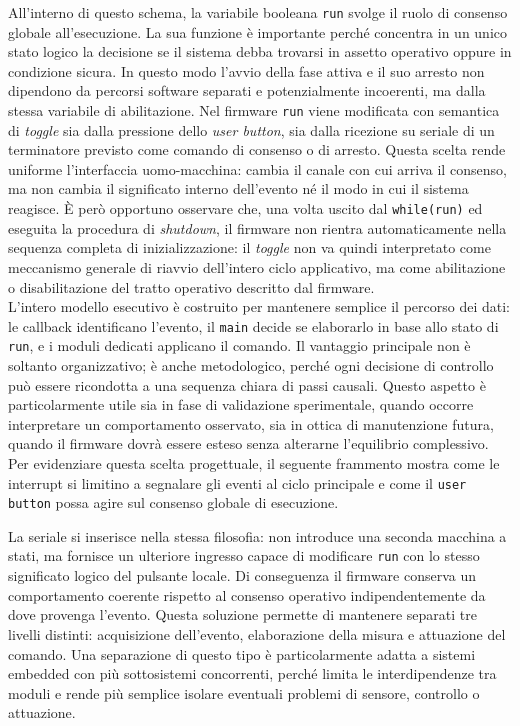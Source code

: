 \documentclass[11pt]{report}
\begin{document}
	All'interno di questo schema, la variabile booleana \texttt{run} svolge il ruolo di consenso globale all'esecuzione. La sua funzione è importante perché concentra in un unico stato logico la decisione se il sistema debba trovarsi in assetto operativo oppure in condizione sicura. In questo modo l'avvio della fase attiva e il suo arresto non dipendono da percorsi software separati e potenzialmente incoerenti, ma dalla stessa variabile di abilitazione. Nel firmware \texttt{run} viene modificata con semantica di \textit{toggle} sia dalla pressione dello \textit{user button}, sia dalla ricezione su seriale di un terminatore previsto come comando di consenso o di arresto. Questa scelta rende uniforme l'interfaccia uomo-macchina: cambia il canale con cui arriva il consenso, ma non cambia il significato interno dell'evento né il modo in cui il sistema reagisce. È però opportuno osservare che, una volta uscito dal \texttt{while(run)} ed eseguita la procedura di \textit{shutdown}, il firmware non rientra automaticamente nella sequenza completa di inizializzazione: il \textit{toggle} non va quindi interpretato come meccanismo generale di riavvio dell'intero ciclo applicativo, ma come abilitazione o disabilitazione del tratto operativo descritto dal firmware.\\
	L'intero modello esecutivo è costruito per mantenere semplice il percorso dei dati: le callback identificano l'evento, il \texttt{main} decide se elaborarlo in base allo stato di \texttt{run}, e i moduli dedicati applicano il comando. Il vantaggio principale non è soltanto organizzativo; è anche metodologico, perché ogni decisione di controllo può essere ricondotta a una sequenza chiara di passi causali. Questo aspetto è particolarmente utile sia in fase di validazione sperimentale, quando occorre interpretare un comportamento osservato, sia in ottica di manutenzione futura, quando il firmware dovrà essere esteso senza alterarne l'equilibrio complessivo.\\
	Per evidenziare questa scelta progettuale, il seguente frammento mostra come le interrupt si limitino a segnalare gli eventi al ciclo principale e come il \texttt{user button} possa agire sul consenso globale di esecuzione.

	

	La seriale si inserisce nella stessa filosofia: non introduce una seconda macchina a stati, ma fornisce un ulteriore ingresso capace di modificare \texttt{run} con lo stesso significato logico del pulsante locale. Di conseguenza il firmware conserva un comportamento coerente rispetto al consenso operativo indipendentemente da dove provenga l'evento. Questa soluzione permette di mantenere separati tre livelli distinti: acquisizione dell'evento, elaborazione della misura e attuazione del comando. Una separazione di questo tipo è particolarmente adatta a sistemi embedded con più sottosistemi concorrenti, perché limita le interdipendenze tra moduli e rende più semplice isolare eventuali problemi di sensore, controllo o attuazione.
\end{document}
